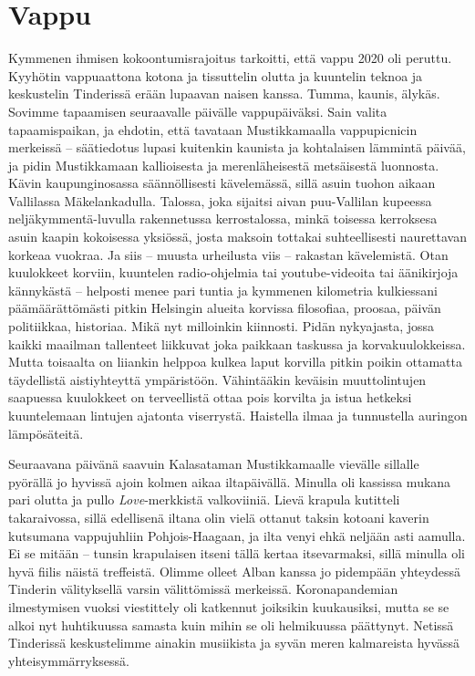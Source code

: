 \documentclass{tsnovel}
\begin{document}
\section{Vappu}

Kymmenen ihmisen kokoontumisrajoitus tarkoitti, että vappu 2020 oli peruttu. Kyyhötin vappuaattona kotona ja tissuttelin olutta ja kuuntelin teknoa ja keskustelin Tinderissä erään lupaavan naisen kanssa. Tumma, kaunis, älykäs. Sovimme tapaamisen seuraavalle päivälle vappupäiväksi. Sain valita tapaamispaikan, ja ehdotin, että tavataan Mustikkamaalla vappupicnicin merkeissä – säätiedotus lupasi kuitenkin kaunista ja kohtalaisen lämmintä päivää, ja pidin Mustikkamaan kallioisesta ja merenläheisestä metsäisestä luonnosta. Kävin kaupunginosassa säännöllisesti kävelemässä, sillä asuin tuohon aikaan Vallilassa Mäkelankadulla. Talossa, joka sijaitsi aivan puu-Vallilan kupeessa neljäkymmentä-luvulla rakennetussa kerrostalossa, minkä toisessa kerroksesa asuin kaapin kokoisessa yksiössä, josta maksoin tottakai suhteellisesti naurettavan korkeaa vuokraa. Ja siis – muusta urheilusta viis – rakastan kävelemistä. Otan kuulokkeet korviin, kuuntelen radio-ohjelmia tai youtube-videoita tai äänikirjoja kännykästä – helposti menee pari tuntia ja kymmenen kilometria kulkiessani päämäärättömästi pitkin Helsingin alueita korvissa  filosofiaa, proosaa, päivän politiikkaa, historiaa. Mikä nyt milloinkin kiinnosti. Pidän nykyajasta, jossa kaikki maailman tallenteet liikkuvat joka paikkaan taskussa ja korvakuulokkeissa. Mutta toisaalta on liiankin helppoa kulkea laput korvilla pitkin poikin ottamatta täydellistä aistiyhteyttä ympäristöön. Vähintääkin keväisin muuttolintujen saapuessa kuulokkeet on terveellistä ottaa pois korvilta ja istua hetkeksi kuuntelemaan lintujen ajatonta viserrystä. Haistella ilmaa ja tunnustella auringon lämpösäteitä.

Seuraavana päivänä saavuin Kalasataman Mustikkamaalle vievälle sillalle pyörällä jo hyvissä ajoin kolmen aikaa iltapäivällä. Minulla oli kassissa mukana pari olutta ja pullo \textit{Love}-merkkistä valkoviiniä. Lievä krapula kutitteli takaraivossa, sillä edellisenä iltana olin vielä ottanut taksin kotoani kaverin kutsumana vappujuhliin Pohjois-Haagaan, ja ilta venyi ehkä neljään asti aamulla. Ei se mitään – tunsin krapulaisen itseni tällä kertaa itsevarmaksi, sillä minulla oli hyvä fiilis näistä treffeistä. Olimme olleet Alban kanssa jo pidempään yhteydessä Tinderin välityksellä varsin välittömissä merkeissä. Koronapandemian ilmestymisen vuoksi viestittely oli katkennut joiksikin kuukausiksi, mutta se se alkoi nyt huhtikuussa samasta kuin mihin se oli helmikuussa päättynyt. Netissä Tinderissä  keskustelimme ainakin musiikista ja syvän meren kalmareista hyvässä yhteisymmärryksessä.
\end{document}
